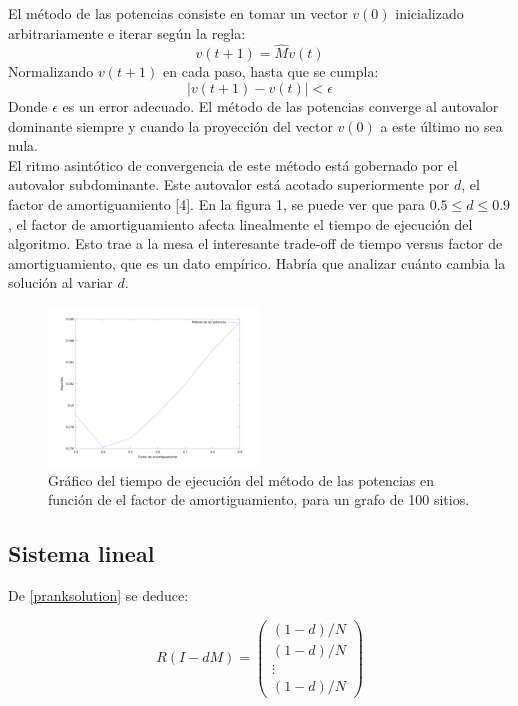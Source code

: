 \documentclass[%
    final,
    notitlepage,
    narroweqnarray,
    inline,
    twoside,
    invited
    ]{lib/ieee}
\begin{document}
El método de las potencias
consiste en tomar un vector $v(0)$ inicializado
arbitrariamente e iterar según la regla:
\begin{equation}
v(t+1) = \widehat{M}v(t)
\end{equation}
Normalizando $v(t+1)$ en cada paso, hasta que se cumpla:
\begin{equation}
\left| v(t+1) - v(t) \right| < \epsilon
\end{equation}
Donde $\epsilon$ es un error adecuado. El método de las potencias converge al autovalor dominante siempre y cuando la proyección del
vector $v(0)$ a este último no sea nula.\\

El ritmo asintótico de convergencia de este método está gobernado por el autovalor subdominante. Este autovalor está acotado
superiormente por $d$, el factor de amortiguamiento [4]. En la figura 1, se puede ver que para $0.5 \leq d \leq 0.9$, el
factor de amortiguamiento afecta linealmente el tiempo de ejecución del algoritmo.
Esto trae a la mesa el interesante trade-off de tiempo versus factor de amortiguamiento, que es un dato empírico. Habría que
 analizar cuánto cambia la solución al variar $d$.

\begin{figure}[h!]
    \centering
    \includegraphics[width=0.5\textwidth]{img/d_pm.png} %
    \caption {Gráfico del tiempo de ejecución del método de las potencias en función de el factor de amortiguamiento, para un grafo de 100 sitios.}
\end{figure}

\subsection{Sistema lineal}

De \eqref{pranksolution} se deduce:

\begin{equation}
    R (I - dM) = \begin{pmatrix}
                     (1-d)/N \\ (1-d)/N \\ \vdots \\ (1-d)/N
                 \end{pmatrix}
\end{equation}
\end{document}
